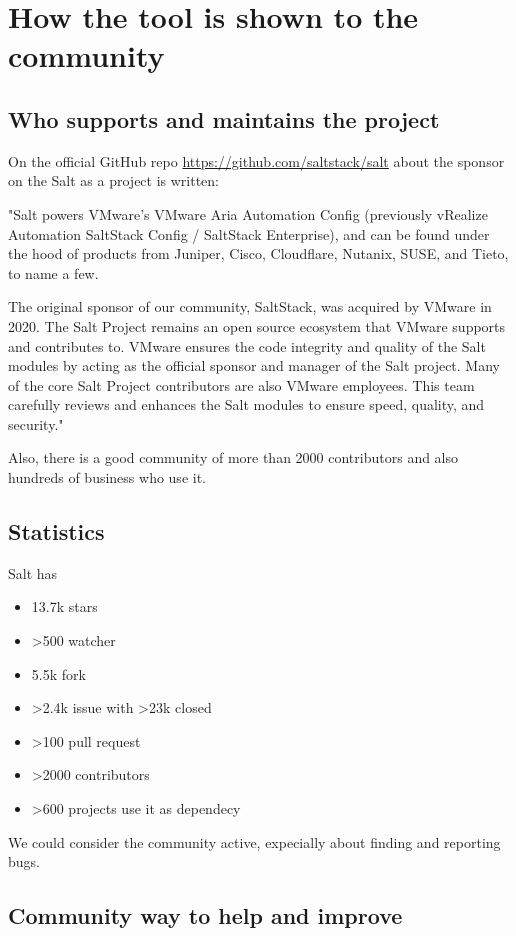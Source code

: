 \documentclass[12pt,a4paper,openright,twoside]{book}
\begin{document}
\section{How the tool is shown to the community}

\subsection{Who supports and maintains the project}
On the official GitHub repo \url{https://github.com/saltstack/salt} about the sponsor on the Salt as a project is written:


"Salt powers VMware's VMware Aria Automation Config (previously vRealize Automation SaltStack Config / SaltStack Enterprise), and can be found under the hood of products from Juniper, Cisco, Cloudflare, Nutanix, SUSE, and Tieto, to name a few.


The original sponsor of our community, SaltStack, was acquired by VMware in 2020. The Salt Project remains an open source ecosystem that VMware supports and contributes to. VMware ensures the code integrity and quality of the Salt modules by acting as the official sponsor and manager of the Salt project. Many of the core Salt Project contributors are also VMware employees. This team carefully reviews and enhances the Salt modules to ensure speed, quality, and security."\cite{saltGitHub}


Also, there is a good community of more than 2000 contributors and also hundreds of business who use it.

\subsection{Statistics}
Salt has 
\begin{itemize}
    \item 13.7k stars
    \item >500 watcher
    \item 5.5k fork
    \item >2.4k issue with >23k closed
    \item >100 pull request
    \item >2000 contributors
    \item >600 projects use it as dependecy
\end{itemize}

We could consider the community active, expecially about finding and reporting bugs.

\subsection{Community way to help and improve}
\end{document}
